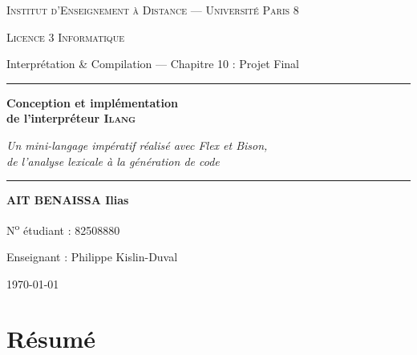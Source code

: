 \documentclass[11pt,a4paper]{report}
\newcommand{\ilang}{\textsc{Ilang}}
\begin{document}
\begin{titlepage}
\centering
\vspace*{1.5cm}
{\scshape\large Institut d'Enseignement à Distance --- Université Paris 8\par}
{\scshape Licence 3 Informatique\par}
\vspace{0.5cm}
{\large Interprétation \& Compilation --- Chapitre 10 : Projet Final\par}
\vspace{2.5cm}
\rule{\linewidth}{0.5mm}\par
\vspace{0.8cm}
{\Huge\bfseries Conception et implémentation\\[0.3cm] de l'interpréteur \ilang\par}
\vspace{0.6cm}
{\Large\itshape Un mini-langage impératif réalisé avec Flex et Bison,\\
de l'analyse lexicale à la génération de code\par}
\vspace{0.8cm}
\rule{\linewidth}{0.5mm}\par
\vspace{2.5cm}
{\large\bfseries AIT BENAISSA Ilias\par}
{\large N\textsuperscript{o} étudiant : 82508880\par}
\vspace{1.5cm}
{\large Enseignant : Philippe Kislin-Duval\par}
\vfill
{\large \today\par}
\end{titlepage}

\chapter*{Résumé}


\tableofcontents
\listoffigures
\lstlistoflistings











\appendix

\end{document}
